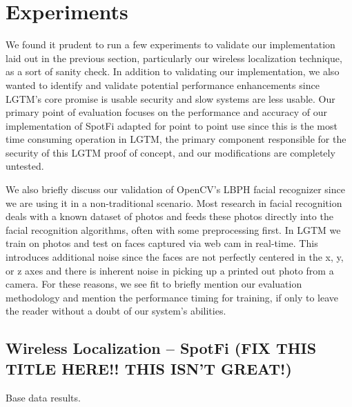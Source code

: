\documentclass[12pt]{report}
\begin{document}

\chapter{Experiments}
We found it prudent to run a few experiments to validate our implementation laid out in the previous section, particularly our wireless localization technique, as a sort of sanity check. In addition to validating our implementation, we also wanted to identify and validate potential performance enhancements since LGTM's core promise is usable security and slow systems are less usable. Our primary point of evaluation focuses on the performance and accuracy of our implementation of SpotFi adapted for point to point use since this is the most time consuming operation in LGTM, the primary component responsible for the security of this LGTM proof of concept, and our modifications are completely untested. \par

We also briefly discuss our validation of OpenCV's LBPH facial recognizer since we are using it in a non-traditional scenario. Most research in facial recognition deals with a known dataset of photos and feeds these photos directly into the facial recognition algorithms, often with some preprocessing first. In LGTM we train on photos and test on faces captured via web cam in real-time. This introduces additional noise since the faces are not perfectly centered in the x, y, or z axes and there is inherent noise in picking up a printed out photo from a camera. For these reasons, we see fit to briefly mention our evaluation methodology and mention the performance timing for training, if only to leave the reader without a doubt of our system's abilities. \par

\section{Wireless Localization -- SpotFi (FIX THIS TITLE HERE!! THIS ISN'T GREAT!)}

\begin{table}
    \begin{center}
        \caption{Base data results.}
        \label{table: base-data-table}
                
    \end{center}
\end{table}
\end{document}
